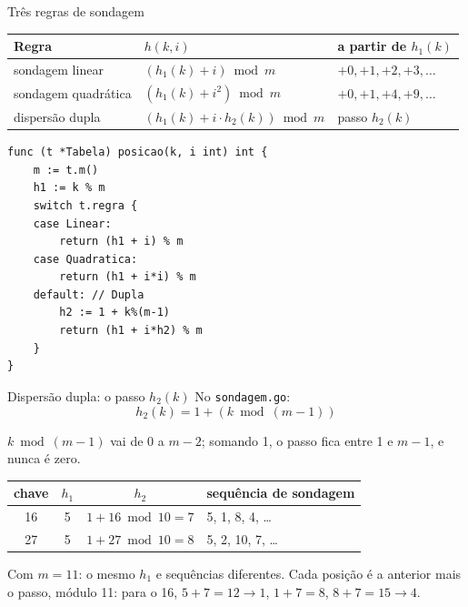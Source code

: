 \documentclass{beamer}
\begin{document}
\begin{frame}[fragile]{Três regras de sondagem}
	\begin{center}
		\small
		\begin{tabular}{lll}
			\toprule
			\textbf{Regra}      & $h(k, i)$                           & \textbf{a partir de $h_1(k)$} \\
			\midrule
			sondagem linear     & $(h_1(k) + i) \bmod m$              & $+0, +1, +2, +3, \ldots$      \\
			sondagem quadrática & $(h_1(k) + i^2) \bmod m$            & $+0, +1, +4, +9, \ldots$      \\
			dispersão dupla     & $(h_1(k) + i \cdot h_2(k)) \bmod m$ & passo $h_2(k)$                \\
			\bottomrule
		\end{tabular}
	\end{center}

	\begin{verbatim}
func (t *Tabela) posicao(k, i int) int {
	m := t.m()
	h1 := k % m
	switch t.regra {
	case Linear:
		return (h1 + i) % m
	case Quadratica:
		return (h1 + i*i) % m
	default: // Dupla
		h2 := 1 + k%(m-1)
		return (h1 + i*h2) % m
	}
}
\end{verbatim}
\end{frame}

\begin{frame}{Dispersão dupla: o passo $h_2(k)$}
	No \texttt{sondagem.go}:
	\[
		h_2(k) = 1 + (k \bmod (m-1))
	\]

	\vspace{0.1cm}
	$k \bmod (m-1)$ vai de 0 a $m-2$; somando 1, o passo fica entre 1 e $m-1$, e
	nunca é zero.

	\vspace{0.3cm}
	\begin{center}
		\small
		\begin{tabular}{cccl}
			\toprule
			\textbf{chave} & $h_1$ & $h_2$                 & \textbf{sequência de sondagem} \\
			\midrule
			16             & 5     & $1 + 16 \bmod 10 = 7$ & 5, 1, 8, 4, \ldots             \\
			27             & 5     & $1 + 27 \bmod 10 = 8$ & 5, 2, 10, 7, \ldots            \\
			\bottomrule
		\end{tabular}
	\end{center}

	\vspace{0.3cm}
	Com $m = 11$: o mesmo $h_1$ e sequências diferentes. Cada posição é a anterior
	mais o passo, módulo 11: para o 16, $5 + 7 = 12 \to 1$, $1 + 7 = 8$,
	$8 + 7 = 15 \to 4$.
\end{frame}
\end{document}

